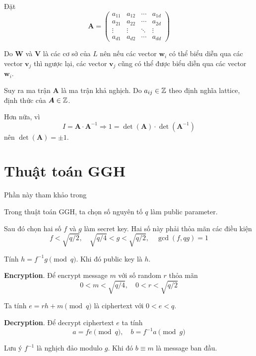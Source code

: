 Đặt
\begin{equation*}
    \bm{A} = \begin{pmatrix}
        a_{11} & a_{12} & \cdots & a_{1d} \\
        a_{21} & a_{22} & \cdots & a_{2d} \\
        \vdots & \vdots & \ddots & \vdots \\
        a_{d1} & a_{d2} & \cdots & a_{dd}
    \end{pmatrix}
\end{equation*}

Do $\bm{W}$ và $\bm{V}$ là các cơ sở của $L$ nên nếu các vector $\bm{w}_i$ có thể biểu diễn qua các vector $\bm{v}_j$ thì ngược lại, các vector $\bm{v}_j$ cũng có thể được biểu diễn qua các vector $\bm{w}_i$.

Suy ra ma trận $\bm{A}$ là ma trận khả nghịch. Do $a_{ij} \in \mathbb{Z}$ theo định nghĩa lattice, định thức của $\bm{A} \in \mathbb{Z}$.

Hơn nữa, vì
\begin{equation*}
    I = \bm{A} \cdot \bm{A}^{-1} \Rightarrow 1 = \det (\bm{A}) \cdot \det (\bm{A}^{-1})
\end{equation*}
nên $\det(\bm{A}) = \pm 1$.

\section{Thuật toán GGH}

Phần này tham khảo trong \cite{HofJef-2014}

Trong thuật toán GGH, ta chọn số nguyên tố $q$ làm public parameter.

Sau đó chọn hai số $f$ và $g$ làm secret key. Hai số này phải thỏa mãn các điều kiện \[ f < \sqrt{q/2}, \quad \sqrt{q/4} < g < \sqrt{q/2}, \quad \gcd(f, qg) = 1 \]

Tính $h = f^{-1} g \pmod q$. Khi đó public key là $h$.

\textbf{Encryption}. Để encrypt message $m$ với số random $r$ thỏa mãn \[ 0 < m < \sqrt{q/4}, \quad 0 < r < \sqrt{q/2} \]

Ta tính $e = rh + m \pmod q$ là ciphertext với $0 < e < q$.

\textbf{Decryption}. Để decrypt ciphertext $e$ ta tính \[ a = fe \pmod q, \quad b = f^{-1} a \pmod g \]

Lưu ý $f^{-1}$ là nghịch đảo modulo $g$. Khi đó $b \equiv m$ là message ban đầu.

